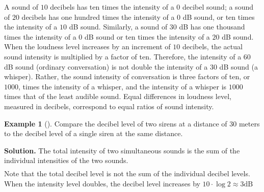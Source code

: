 \documentclass[10pt,]{book}
\theoremstyle{plain}
\theoremstyle{definition}
\theoremstyle{definition}
\newtheorem{example}[theorem]{Example}
\theoremstyle{definition}
\numberwithin{equation}{section}
\begin{document}
\hypertarget{p-310}{}%
A sound of \(10\) decibels has ten times the intensity of a \(0\) decibel sound; a sound of \(20\) decibels has one hundred times the intensity of a \(0\) dB sound, or ten times the intensity of a \(10\) dB sound. Similarly, a sound of \(30\) dB has one thousand times the intensity of a \(0\) dB sound or ten times the intensity of a \(20\) dB sound.  When the loudness level increases by an increment of \(10\) decibels, the actual sound intensity is multiplied by a factor of ten.  Therefore, the intensity of a \(60\) dB sound (ordinary conversation) is not double the intensity of a \(30\) dB sound (a whisper).  Rather, the sound intensity of conversation is three factors of ten, or \(1000\), times the intensity of a whisper, and the intensity of a whisper is \(1000\) times that of the least audible sound.  Equal differences in loudness level, measured in decibels, correspond to equal ratios of sound intensity.%
\begin{example}[]\label{example-24}
\hypertarget{p-311}{}%
Compare the decibel level of two sirens at a distance of \(30\) meters to the decibel level of a single siren at the same distance.%
\par\smallskip%
\noindent\textbf{Solution.}\hypertarget{solution-24}{}\quad%
\hypertarget{p-312}{}%
The total intensity of two simultaneous sounds is the sum of the individual intensities of the two sounds.%
\begin{align*}
\end{align*}
Note that the total decibel level is not the sum of the individual decibel levels.  When the intensity level doubles, the decibel level increases by \(10\cdot\log2 \approx 3 \text{dB}\)%
\end{example}
\typeout{************************************************}
\typeout{************************************************}
\end{document}
